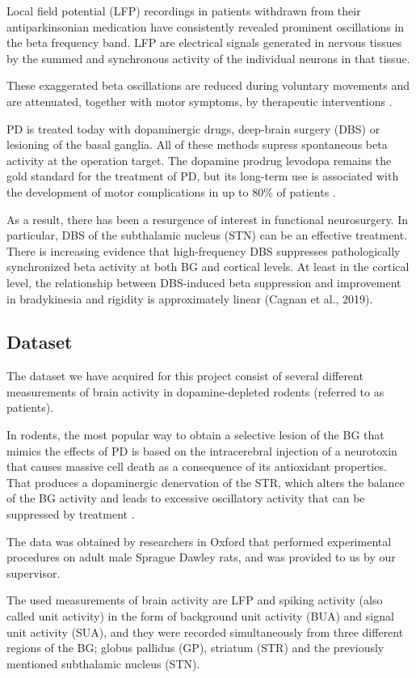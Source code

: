 \documentclass{article}
\begin{document}
Local field potential (LFP) recordings in patients withdrawn from their antiparkinsonian medication have consistently revealed prominent oscillations in the beta frequency band. LFP are electrical signals generated in nervous tissues by the summed and synchronous activity of the individual neurons in that tissue.

These exaggerated beta oscillations are reduced during voluntary movements and are attenuated, together with motor symptoms, by therapeutic interventions \citep{Cagnan}. 

PD is treated today with dopaminergic drugs, deep-brain surgery (DBS) or lesioning of the basal ganglia. All of these methods supress spontaneous beta activity at the operation target. The dopamine prodrug levodopa remains the gold standard for the treatment of PD, but its long-term use is associated with the development of motor complications in up to 80\% of patients \citep{Hammond}.

As a result, there has been a resurgence of interest in functional neurosurgery. In particular, DBS of the subthalamic nucleus (STN) can be an effective treatment. There is increasing evidence that high-frequency DBS suppresses pathologically synchronized beta activity at both BG and cortical levels. At least in the cortical level, the relationship between DBS-induced beta suppression and improvement in bradykinesia and rigidity is approximately linear (Cagnan et al., 2019). 

\subsection{Dataset}
The dataset we have acquired for this project consist of several different measurements of brain activity in dopamine-depleted rodents (referred to as patients). 

In rodents, the most popular way to obtain a selective lesion of the BG that mimics the effects of PD is based on the intracerebral injection of a neurotoxin that causes massive cell death as a consequence of its antioxidant properties. That produces a dopaminergic denervation of the STR, which alters the balance of the BG activity and leads to excessive oscillatory activity that can be suppressed by treatment \citep{Mallet}.

The data was obtained by researchers in Oxford that performed experimental procedures on adult male Sprague Dawley rats, and was provided to us by our supervisor.

The used measurements of brain activity are LFP and spiking activity (also called unit activity) in the form of background unit activity (BUA) and signal unit activity (SUA), and they were recorded simultaneously from three different regions of the BG; globus pallidus (GP), striatum (STR) and the previously mentioned subthalamic nucleus (STN).
\end{document}
